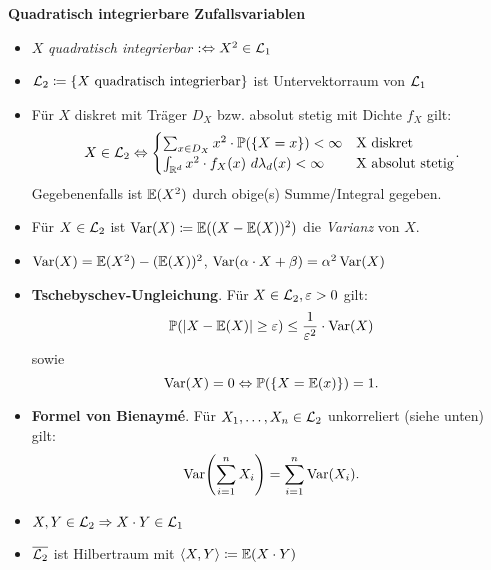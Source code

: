 \textbf{Quadratisch integrierbare Zufallsvariablen}
\begin{itemize}
\item $X$ \textit{quadratisch integrierbar} $:\Leftrightarrow X^2\in\mathcal{L}_1$

\item $\mathcal{L}_2 \coloneqq \{X \text{ quadratisch integrierbar}\}$ ist Untervektorraum von $\mathcal{L}_1$

\item Für $X$ diskret mit Träger $D_X$ bzw. absolut stetig mit Dichte $f_X$ gilt:
  \[
    X\in\L_2\Leftrightarrow
    \begin{cases}
    \sum_{x \in D_X} x^2 \cdot \Pr(\{X=x\}) < \infty			& \text{X diskret} \\
    \int_{\R^d} x^2\cdot f_X(x)~d\lambda_d(x) < \infty		& \text{X absolut stetig}
    \end{cases}.
  \]
Gegebenenfalls ist $\mathbb{E}(X^2)$ durch obige(s) Summe/Integral gegeben.

\item Für $X\in\mathcal{L}_2$ ist $\operatorname{Var}(X) \coloneqq \mathbb{E}((X-\mathbb{E}(X))^2)$ die \textit{Varianz} von $X$.

\item $\operatorname{Var}(X) = \mathbb{E}(X^2) - (\mathbb{E}(X))^2$,
  \quad $\operatorname{Var}(\alpha \cdot X + \beta) = \alpha^2\operatorname{Var}(X)$

\item \textbf{Tschebyschev-Ungleichung}. Für $X\in\mathcal{L}_2, \varepsilon > 0$ gilt:
  \[
    \mathbb{P}(|X-\mathbb{E}(X)| \geq \varepsilon) \leq \frac{1}{\varepsilon^2} \cdot \operatorname{Var}(X)
  \]
  sowie
  \[
    \operatorname{Var}(X) = 0 \Leftrightarrow \mathbb{P}(\{X=\mathbb{E}(x)\}) = 1.
  \]

\item \textbf{Formel von Bienaymé}. Für $X_1,\ldots,X_n\in\mathcal{L}_2$ unkorreliert (siehe unten) gilt:
  \[
    \Var\left(\sum_{i=1}^n X_i\right) = \sum_{i=1}^n \Var(X_i).
  \]

\item $X,Y\in\mathcal{L}_2 \Rightarrow X \cdot Y \in\mathcal{L}_1$

\item $\overline{\mathcal{L}_2}$ ist Hilbertraum mit $\langle X,Y \rangle \coloneqq \mathbb{E}(X \cdot Y)$
\end{itemize}
\hspace{3em}

